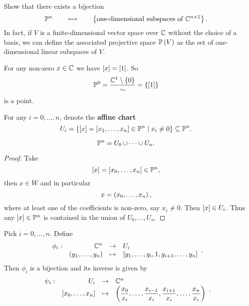 \begin{exercise}
Show that there exists a bijection
$$ \P^n \qquad \leftrightsquigarrow \qquad \cb{\text{one-dimensional subspaces of} \ \C^{n + 1}}. $$
In fact, if $ V $ is a finite-dimensional vector space over $ \C $ without the choice of a basis, we can define the associated projective space $ \P\rb{V} $ as the set of one-dimensional linear subspaces of $ V $.
\end{exercise}

\begin{example}
For any non-zero $ x \in \C $ we have $ \sb{x} = \sb{1} $. So
$$ \P^0 = \dfrac{\C^1 \setminus \cb{0}}{\sim} = \cb{\sb{1}} $$
is a point.
\end{example}

\begin{notation}
For any $ i = 0, \dots, n $, denote the \textbf{affine chart}
$$ U_i = \cb{\sb{x} = \sb{x_1, \dots, x_n} \in \P^n \mid x_i \ne 0} \subseteq \P^n. $$
\end{notation}

\begin{lemma}
\label{lem:3.9}
$$ \P^n = U_0 \cup \dots \cup U_n. $$
\end{lemma}

\begin{proof}
Take
$$ \sb{x} = \sb{x_0, \dots, x_n} \in \P^n, $$
then $ x \in W $ and in particular
$$ x = \rb{x_0, \dots, x_n}, $$
where at least one of the coefficients is non-zero, say $ x_i \ne 0 $. Then $ \sb{x} \in U_i $. Thus any $ \sb{x} \in \P^n $ is contained in the union of $ U_0, \dots, U_n $.
\end{proof}

\begin{lemma}
\label{lem:3.10}
Pick $ i = 0, \dots, n $. Define
$$ \function[\phi_i]{\C^n}{U_i}{\rb{y_1, \dots, y_n}}{\sb{y_1, \dots, y_i, 1, y_{i + 1}, \dots, y_n}}. $$
Then $ \phi_i $ is a bijection and its inverse is given by
$$ \function[\psi_i]{U_i}{\C^n}{\sb{x_0, \dots, x_n}}{\rb{\dfrac{x_0}{x_i}, \dots, \dfrac{x_{i - 1}}{x_i}, \dfrac{x_{i + 1}}{x_i}, \dots, \dfrac{x_n}{x_i}}}. $$
\end{lemma}

